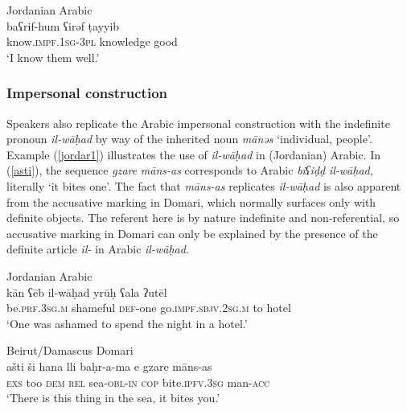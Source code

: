 \documentclass[output=paper]{langsci/langscibook}
\begin{document}
\ea
{Jordanian Arabic}\\ \label{jordar}
\gll baʕrif-hum ʕirəf ṭayyib\\
     know.\textsc{impf.1sg-3pl} knowledge good\\
\glt ‘I know them well.’
\z


 \subsubsection{Impersonal construction}

Speakers also replicate the Arabic impersonal construction with the indefinite pronoun \textit{il-wāḥad} by way of the inherited noun \textit{mānəs} ‘individual, people’. Example (\ref{jordar1}) illustrates the use of \textit{il-wāḥad} in (Jordanian) Arabic. In (\ref{asti}), the sequence \textit{gzare} \textit{māns-as} corresponds to Arabic \textit{biʕiḍḍ} \textit{il-wāḥad,} literally ‘it bites one’. The fact that \textit{māns-as} replicates \textit{il-wāḥad} is also apparent from the accusative marking in Domari, which normally surfaces only with definite objects. The referent here is by nature indefinite and non-referential, so accusative marking in Domari can only be explained by the presence of the definite article \textit{il-} in Arabic \textit{il-wāḥad}.

\ea
{Jordanian Arabic}\\ \label{jordar1}
\gll kān ʕēb il-wāḥad yrūḥ ʕala ʔutēl\\
     be.\textsc{prf.3sg.m} shameful \textsc{def-}one go.\textsc{impf.sbjv.2sg.m} to hotel\\
\glt ‘One was ashamed to spend the night in a hotel.’
\z

\ea \label{asti}
{Beirut/Damascus Domari}\\
\gll ašti ši hana lli baḥr-a-ma e gzare māns-as\\
     \textsc{exs} too \textsc{dem} \textsc{rel} sea-\textsc{obl-in} \textsc{cop} bite.\textsc{ipfv.3sg} man-\textsc{acc}\\
\glt ‘There is this thing in the sea, it bites you.’
\z
\end{document}
